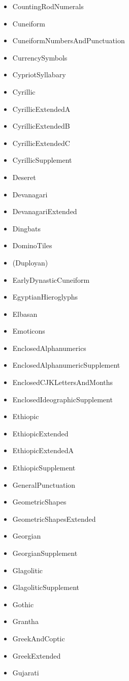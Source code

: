 \documentclass{article}
\newenvironment{itemlist}{%
  \begin{itemize}
	\setlength{\itemsep}{0pt}
	\setlength{\parsep}{0pt}
	\setlength{\topsep}{0pt}
	\setlength{\partopsep}{0pt}
	\setlength{\parskip}{0pt}
	\setlength{\labelsep}{5pt}}%
{
  \end{itemize}}
\begin{document}
\begin{multicols*}{2}
\begin{itemlist}
				\item CountingRodNumerals
				\item Cuneiform
				\item CuneiformNumbersAndPunctuation
				\item CurrencySymbols
				\item CypriotSyllabary
				\item Cyrillic
				\item CyrillicExtendedA
				\item CyrillicExtendedB
				\item CyrillicExtendedC
				\item CyrillicSupplement
				\item Deseret
				\item Devanagari
				\item DevanagariExtended
				\item Dingbats
				\item DominoTiles
				\item (Duployan)
				\item EarlyDynasticCuneiform
				\item EgyptianHieroglyphs
				\item Elbasan
				\item Emoticons
				\item EnclosedAlphanumerics
				\item EnclosedAlphanumericSupplement
				\item EnclosedCJKLettersAndMonths
				\item EnclosedIdeographicSupplement
				\item Ethiopic
				\item EthiopicExtended
				\item EthiopicExtendedA
				\item EthiopicSupplement
				\item GeneralPunctuation
				\item GeometricShapes
				\item GeometricShapesExtended
				\item Georgian
				\item GeorgianSupplement
				\item Glagolitic
				\item GlagoliticSupplement
				\item Gothic
				\item Grantha
				\item GreekAndCoptic
				\item GreekExtended
				\item Gujarati

\end{itemlist}
\end{multicols*}
\end{document}
